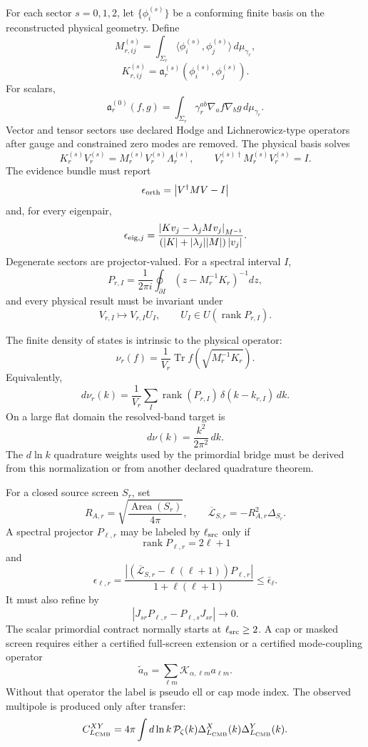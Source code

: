 \begin{definition}\label{def:physical-mode-basis}
For each sector \(s=0,1,2\), let \(\{\phi_i^{(s)}\}\) be a conforming finite basis on the
reconstructed physical geometry.  Define
\[
M^{(s)}_{r,ij}=\int_{\Sigma_r}
\langle\phi_i^{(s)},\phi_j^{(s)}\rangle\,d\mu_{\gamma_r},
\]
\[
K^{(s)}_{r,ij}=
\mathfrak a_r^{(s)}(\phi_i^{(s)},\phi_j^{(s)}).
\]
For scalars,
\[
\mathfrak a_r^{(0)}(f,g)=
\int_{\Sigma_r}\gamma_r^{ab}\nabla_a f\nabla_b g\,d\mu_{\gamma_r}.
\]
Vector and tensor sectors use declared Hodge and Lichnerowicz-type operators after gauge and
constrained zero modes are removed.  The physical basis solves
\[
K_r^{(s)}V_r^{(s)}=M_r^{(s)}V_r^{(s)}\Lambda_r^{(s)},\qquad
V_r^{(s)\dagger}M_r^{(s)}V_r^{(s)}=I.
\]
The evidence bundle must report
\[
\epsilon_{\rm orth}=\left|V^\dagger M V-I\right|
\]
and, for every eigenpair,
\[
\epsilon_{{\rm eig},j}
=
\frac{
\left|Kv_j-\lambda_jMv_j\right|_{M^{-1}}
}{
\left(|K|+|\lambda_j||M|\right)|v_j|
}.
\]
Degenerate sectors are projector-valued.  For a spectral interval \(I\),
\[
P_{r,I}=\frac{1}{2\pi i}
\oint_{\partial I}\left(z-M_r^{-1}K_r\right)^{-1}dz,
\]
and every physical result must be invariant under
\[
V_{r,I}\longmapsto V_{r,I}U_I,\qquad
U_I\in U(\operatorname{rank}P_{r,I}).
\]
\end{definition}

\begin{definition}\label{def:finite-spectral-measure}
The finite density of states is intrinsic to the physical operator:
\[
\nu_r(f)=\frac1{V_r}\operatorname{Tr}
f\!\left(\sqrt{M_r^{-1}K_r}\right).
\]
Equivalently,
\[
d\nu_r(k)=\frac1{V_r}\sum_I
\operatorname{rank}(P_{r,I})\,\delta(k-k_{r,I})\,dk.
\]
On a large flat domain the resolved-band target is
\[
d\nu(k)=\frac{k^2}{2\pi^2}\,dk.
\]
The \(d\ln k\) quadrature weights used by the primordial bridge must be derived from this
normalization or from another declared quadrature theorem.
\end{definition}

\begin{definition}\label{def:source-angular-sector}
For a closed source screen \(S_r\), set
\[
R_{A,r}=\sqrt{\frac{\operatorname{Area}(S_r)}{4\pi}},
\qquad
\overline{\mathcal L}_{S,r}=-R_{A,r}^{2}\Delta_{S_r}.
\]
A spectral projector \(P_{\ell,r}\) may be labeled by \(\ell_{\rm src}\) only if
\[
\operatorname{rank}P_{\ell,r}=2\ell+1
\]
and
\[
\epsilon_{\ell,r}=
\frac{
\left|(\overline{\mathcal L}_{S,r}-\ell(\ell+1))P_{\ell,r}\right|
}{
1+\ell(\ell+1)
}
\le \bar\epsilon_\ell.
\]
It must also refine by
\[
\left|J_{sr}P_{\ell,r}-P_{\ell,s}J_{sr}\right|\to0.
\]
The scalar primordial contract normally starts at \(\ell_{\rm src}\ge2\).  A cap or masked screen
requires either a certified full-screen extension or a certified mode-coupling operator
\[
\widetilde a_\alpha=\sum_{\ell m}\mathcal K_{\alpha,\ell m}a_{\ell m}.
\]
Without that operator the label is \(\text{pseudo ell}\) or \(\text{cap mode index}\).
The observed multipole is produced only after transfer:
\[
C_{L_{\rm CMB}}^{XY}
=4\pi\int d\ln k\,
\mathcal P_\zeta(k)\Delta_{L_{\rm CMB}}^X(k)\Delta_{L_{\rm CMB}}^Y(k).
\]
\end{definition}

